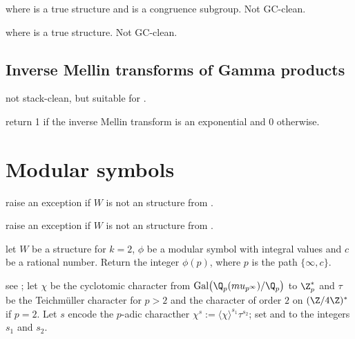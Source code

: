 
 where
 is a true  structure and  is a congruence subgroup. Not GC-clean.

 where
 is a true  structure. Not GC-clean.


\section{Inverse Mellin transforms of Gamma products}



 not stack-clean, but
suitable for .

 return 1 if the inverse Mellin transform is
an exponential and 0 otherwise.



\newpage

\chapter{Modular symbols}

 raise an exception if $W$ is not an 
structure from .

 raise an exception if $W$ is not an
 structure from .

 let $W$ be a 
structure for $k = 2$, $\phi$ be a modular symbol with integral values
and $c$ be a rational number. Return the integer $\phi(p)$,
where $p$ is the path $\{\infty,c\}$.

 see ;
let $\chi$ be the  cyclotomic  character from
$\text{Gal}\big(\Q_p(mu_{p^\infty})/\Q_p\big)$ to $\Z_p^*$
and $\tau$ be the Teichm\"uller character for $p > 2$ and the character of
order $2$ on $(\Z/4\Z)^*$ if $p = 2$. Let $s$ encode
the $p$-adic characther $\chi^s := \langle\chi\rangle^{s_1} \tau^{s_2}$;
set  and  to the integers $s_1$ and $s_2$.

